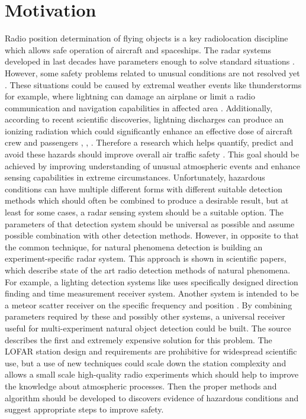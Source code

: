 \documentclass[twoside]{ctuthesis}
\theoremstyle{plain}
\theoremstyle{definition}
\theoremstyle{note}
\begin{document}
\maketitle

\chapter{Motivation}
Radio position determination of flying objects is a key radiolocation discipline which allows safe operation of aircraft and spaceships. The radar systems developed in last decades have parameters enough to solve standard situations \cite{Radar_basics}. However, some safety problems related to unusual conditions are not resolved yet \cite{lightning_dose1}. These situations could be caused by extremal weather events like thunderstorms for example, where lightning can damage an airplane or limit a radio communication and navigation capabilities in affected area \cite{lightning_dose2}. Additionally, according to recent scientific discoveries, lightning discharges can produce an ionizing radiation which could significantly enhance an effective dose of aircraft crew and passengers \cite{lightning_dose3}, \cite{lightning_dose4}, \cite{lightning_dose6}. 
Therefore a research which helps quantify, predict and avoid these hazards should improve overall air traffic safety \cite{lightning_dose5}. This goal should be achieved by improving understanding of unusual atmospheric events and enhance sensing capabilities in extreme circumstances. 
Unfortunately, hazardous conditions can have multiple different forms with different suitable detection methods which should often be combined to produce a desirable result, but at least for some cases, a radar sensing system should be a suitable option. 
The parameters of that detection system should be universal as possible and assume possible combination with other detection methods. 
However, in opposite to that the common technique, for natural phenomena detection is building an experiment-specific radar system. 
This approach is shown in scientific papers, which describe state of the art radio detection methods of natural phenomena. For example, a lighting detection systems like \cite{NMLMA} uses specifically designed direction finding and time measurement receiver system.  Another system is intended to be a meteor scatter receiver on the specific frequency and position \cite{BRAMS}. 
By combining parameters required by these and possibly other systems, a universal receiver useful for multi-experiment natural object detection could be built. The source \cite{LOFAR} describes the first and extremely expensive solution for this problem. The LOFAR station design and requirements are prohibitive for widespread scientific use, but a use of new techniques could scale down the station complexity and allows a small scale high-quality radio experiments which should help to improve the knowledge about atmospheric processes. Then the proper methods and algorithm should be developed to discovers evidence of hazardous conditions and suggest appropriate steps to improve safety. 
\end{document}
